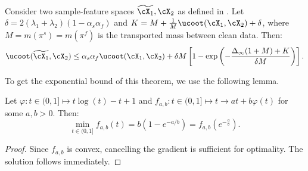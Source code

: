 \begin{theorem}
  \label{thm:ucoot_robust_copy}
  Consider two sample-feature spaces $\widetilde{\cX_1}, \cX_2$ as defined in
  . Let
  $\delta = 2(\lambda_1 + \lambda_2)(1 - \alpha_s\alpha_f)$ and
  $K = M + \frac{1}{M}\ucoot(\cX_1, \cX_2) +\delta$, where
  $M= m(\pi^s) = m(\pi^f)$ is the transported mass between clean data. Then:
     \begin{equation*} %
      \begin{split}
        \ucoot(\widetilde{\cX_1}, \cX_2)
        \leq \alpha_s \alpha_f \ucoot(\cX_1, \cX_2) +
        \delta M \left[ 1 - \exp \left( {- \frac{\Delta_{\infty}(1+M) + K}{\delta M}} \right) \right].
      \end{split}\vspace{-10mm}
    \end{equation*}
  \end{theorem}
  To get the exponential bound of this theorem, we use the following lemma.
  \begin{lemma}
  \label{slem:bound}
  Let $\varphi: t \in (0, 1] \mapsto t\log(t) - t + 1$ and
  $f_{a, b}: t \in (0, 1] \mapsto t \to at + b \varphi(t)$ for some $a, b > 0$.
  Then:
  \begin{equation*}
      \min_{t \in (0, 1]} f_{a, b}(t) = b(1 - e^{-a/b}) = f_{a, b}(e^{-\frac{a}{b}}).
  \end{equation*}
  \end{lemma}
  \begin{proof}
    Since $f_{a,b}$ is convex, cancelling the gradient is sufficient for optimality.
    The solution follows immediately.
  \end{proof}
